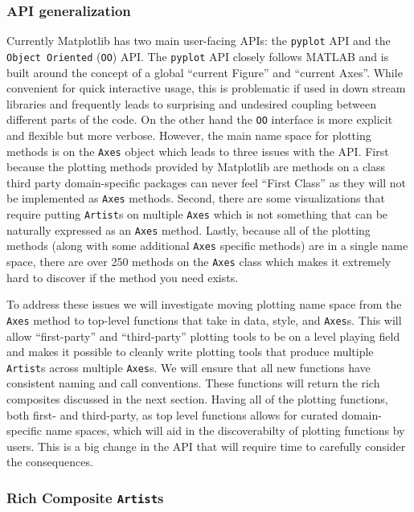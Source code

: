 \documentclass[11pt]{article}  %
\begin{document}
\subsubsection{API generalization}

Currently Matplotlib has two main user-facing APIs: the
\texttt{pyplot} API and the \texttt{Object Oriented} (\texttt{OO})
API.
The \texttt{pyplot} API closely follows MATLAB and is built around the concept
of a global ``current Figure'' and ``current Axes''.
While
convenient for quick interactive usage, this is
problematic if used in down stream libraries and frequently leads to surprising
and undesired coupling between different parts of the code.
On the other hand the \texttt{OO} interface is more explicit and
flexible but more verbose.
  However, the main name space
for plotting methods is on the \texttt{Axes} object which leads to
three issues with the API.
  First because the plotting methods
provided by Matplotlib are methods on a class third party
domain-specific packages can never feel ``First Class'' as they will
not be implemented as \texttt{Axes} methods.
  Second, there are some
visualizations that require putting \texttt{Artist}s on
multiple \texttt{Axes} which is not something that can be naturally
expressed as an \texttt{Axes} method.
Lastly, because all of the
plotting methods (along with some additional \texttt{Axes} specific
methods) are in a single name space, there are over 250 methods on the
\texttt{Axes} class which makes it extremely hard to discover if the
method you need exists.


To address these issues we will investigate moving plotting name
space from the \texttt{Axes} method to top-level functions that take in
data, style, and \texttt{Axes}s.
This will allow ``first-party'' and
``third-party'' plotting tools to be on a level playing field and
makes it possible to cleanly write plotting tools that produce
multiple \texttt{Artist}s across multiple \texttt{Axes}s.
We will ensure that all new functions have consistent naming and call
conventions.
These
functions will return the rich composites discussed in the next
section.
Having all of the plotting functions, both first- and third-party, as
top level functions allows for curated domain-specific name spaces,
which will aid in the discoverabilty of plotting functions by users.
This is a big change in the API that will require time to carefully consider the consequences. 

\subsubsection{Rich Composite \texttt{Artist}s}
\end{document}
